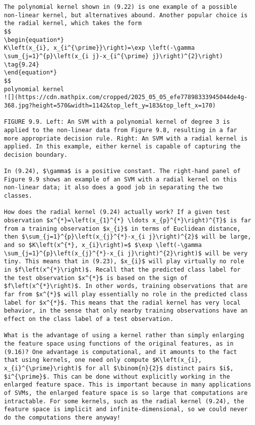\documentclass[10pt]{article}
\begin{document}
\begin{verbatim}
The polynomial kernel shown in (9.22) is one example of a possible non-linear kernel, but alternatives abound. Another popular choice is the radial kernel, which takes the form
$$
\begin{equation*}
K\left(x_{i}, x_{i^{\prime}}\right)=\exp \left(-\gamma \sum_{j=1}^{p}\left(x_{i j}-x_{i^{\prime} j}\right)^{2}\right) \tag{9.24}
\end{equation*}
$$
polynomial kernel
![](https://cdn.mathpix.com/cropped/2025_05_05_efe77898333945044de4g-368.jpg?height=570&width=1142&top_left_y=183&top_left_x=170)

FIGURE 9.9. Left: An SVM with a polynomial kernel of degree 3 is applied to the non-linear data from Figure 9.8, resulting in a far more appropriate decision rule. Right: An SVM with a radial kernel is applied. In this example, either kernel is capable of capturing the decision boundary.

In (9.24), $\gamma$ is a positive constant. The right-hand panel of Figure 9.9 shows an example of an SVM with a radial kernel on this non-linear data; it also does a good job in separating the two classes.

How does the radial kernel (9.24) actually work? If a given test observation $x^{*}=\left(x_{1}^{*} \ldots x_{p}^{*}\right)^{T}$ is far from a training observation $x_{i}$ in terms of Euclidean distance, then $\sum_{j=1}^{p}\left(x_{j}^{*}-x_{i j}\right)^{2}$ will be large, and so $K\left(x^{*}, x_{i}\right)=$ $\exp \left(-\gamma \sum_{j=1}^{p}\left(x_{j}^{*}-x_{i j}\right)^{2}\right)$ will be very tiny. This means that in (9.23), $x_{i}$ will play virtually no role in $f\left(x^{*}\right)$. Recall that the predicted class label for the test observation $x^{*}$ is based on the sign of $f\left(x^{*}\right)$. In other words, training observations that are far from $x^{*}$ will play essentially no role in the predicted class label for $x^{*}$. This means that the radial kernel has very local behavior, in the sense that only nearby training observations have an effect on the class label of a test observation.

What is the advantage of using a kernel rather than simply enlarging the feature space using functions of the original features, as in (9.16)? One advantage is computational, and it amounts to the fact that using kernels, one need only compute $K\left(x_{i}, x_{i}^{\prime}\right)$ for all $\binom{n}{2}$ distinct pairs $i$, $i^{\prime}$. This can be done without explicitly working in the enlarged feature space. This is important because in many applications of SVMs, the enlarged feature space is so large that computations are intractable. For some kernels, such as the radial kernel (9.24), the feature space is implicit and infinite-dimensional, so we could never do the computations there anyway!


\end{verbatim}
\end{document}
